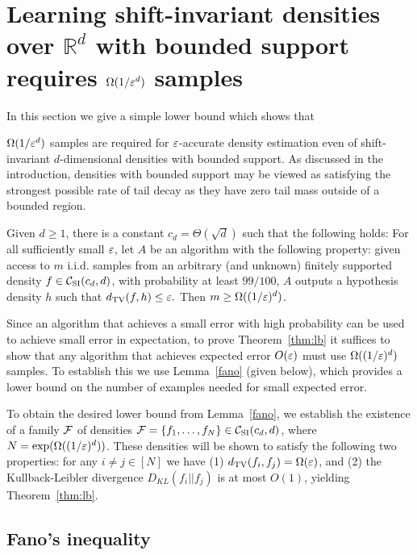 

\section{Learning shift-invariant densities over $\mathbb{R}^d$ with bounded support requires $\Omega(1/\varepsilon^d)$ samples}
\label{sec:lowerbound}

In this section we give a simple lower bound which shows that  $\Omega(1/\varepsilon^d)$ samples are required for $\varepsilon$-accurate density estimation even of shift-invariant $d$-dimensional densities with bounded support.  As discussed in the introduction, densities with bounded support may be viewed as satisfying the strongest possible rate of tail decay as they have zero tail mass outside of a bounded region.

\begin{theorem} \label{thm:lb}
Given $d \geq 1$, there is a constant $c_d=\Theta(\sqrt{d})$ such that the following holds:  For all sufficiently small $\varepsilon$,
let $A$ be an algorithm with the following property:  given access to $m$ i.i.d. samples from an arbitrary (and unknown) finitely supported density $f \in {\cal C}_{\mathrm{SI}}(c_d,d)$, with probability at least $99/100$, $A$ outputs a hypothesis density $h$ such that $d_\mathrm{TV}(f,h) \leq \varepsilon.$  Then $m \geq \Omega((1/\varepsilon)^d)$.
\end{theorem}

Since an algorithm that achieves a small error with high probability can be used to achieve small error in expectation, to prove Theorem~\ref{thm:lb} it suffices to show that any algorithm that achieves expected error $O(\varepsilon)$ must use
$\Omega((1/\varepsilon)^d)$ samples.  To establish this we use  Lemma~\ref{fano} (given below), which provides a lower bound on the number of examples needed for small expected error.  

To obtain the desired lower bound from Lemma~\ref{fano}, we establish the existence of a family ${\cal F}$ of densities ${\cal F} = \{f_1,\dots,f_N\} \in {\cal C}_{\mathrm{SI}}(c_d,d)$, where $N= \exp(\Omega((1/\varepsilon)^d))$.  These densities will be shown to satisfy the following two properties: for any  $i \neq j \in [N]$ we have (1) $d_\mathrm{TV}(f_i,f_j) = \Omega(\varepsilon)$, and (2) the Kullback-Leibler divergence $D_{KL}(f_i || f_j)$ is at most $O(1)$, yielding Theorem~\ref{thm:lb}. 

\subsection{Fano's inequality}

